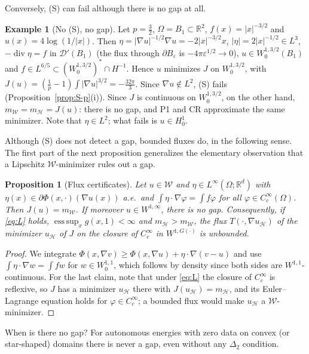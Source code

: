 \documentclass[11pt]{amsart}
\newtheorem{proposition}[theorem]{Proposition}
\theoremstyle{definition}
\newtheorem{example}[theorem]{Example}
\theoremstyle{remark}
\numberwithin{equation}{section}
\newcommand{\R}{\mathbb{R}}
\newcommand{\abs}[1]{\lvert #1\rvert}
\newcommand{\Wc}{\mathcal W}
\newcommand{\Hc}{\mathcal H}
\newcommand{\mW}{m_{\mathcal W}}
\newcommand{\mH}{m_{\mathcal H}}
\DeclareMathOperator{\divg}{div}
\DeclareMathOperator*{\esssup}{ess\,sup}
\begin{document}
Conversely, (S) can fail although there is no gap at all.

\begin{example}[No (S), no gap]\label{ex:noS}
Let $p=\frac32$, $\Omega=B_1\subset\R^2$, $f(x)=\abs x^{-3/2}$ and $u(x)=4\log(1/\abs x)$. Then $\eta=\abs{\nabla u}^{-1/2}\nabla u=-2\abs x^{-3/2}x$, $\abs\eta=2\abs x^{-1/2}\in L^{3}$, $-\divg\eta=f$ in $\mathcal D'(B_1)$ (the flux through $\partial B_\varepsilon$ is $-4\pi\varepsilon^{1/2}\to0$), $u\in W^{1,3/2}_0(B_1)$ and $f\in L^{6/5}\subset(W^{1,3/2}_0)^*\cap H^{-1}$. Hence $u$ minimizes $J$ on $W^{1,3/2}_0$, with $J(u)=(\frac1p-1)\int\abs{\nabla u}^{3/2}=-\frac{32\pi}3$. Since $\nabla u\notin L^2$, (S) fails (Proposition~\ref{prop:S-p}(i)). Since $J$ is continuous on $W^{1,3/2}_0$, on the other hand, $\mW=\mH=J(u)$: there is no gap, and P1 and CR approximate the same minimizer. Note that $\eta\in L^2$; what fails is $u\in H^1_0$.
\end{example}

Although (S) does not detect a gap, bounded fluxes do, in the following sense. The first part of the next proposition generalizes the elementary observation that a Lipschitz $\Wc$-minimizer rules out a gap.

\begin{proposition}[Flux certificates]\label{prop:cert}
Let $u\in\Wc$ and $\eta\in L^\infty(\Omega;\R^d)$ with $\eta(x)\in\partial\Phi(x,\cdot)(\nabla u(x))$ a.e.\ and $\int\eta\cdot\nabla\varphi=\int f\varphi$ for all $\varphi\in C^\infty_c(\Omega)$. Then $J(u)=\mW$. If moreover $u\in W^{1,\infty}$, there is no gap. Consequently, if \eqref{eq:L} holds, $\esssup_xg(x,1)<\infty$ and $\mH>\mW$, the flux $T(\cdot,\nabla u_{\Hc})$ of the minimizer $u_{\Hc}$ of $J$ on the closure of $C^\infty_c$ in $W^{1,G(\cdot)}$ is unbounded.
\end{proposition}
\begin{proof}
We integrate $\Phi(x,\nabla v)\ge\Phi(x,\nabla u)+\eta\cdot\nabla(v-u)$ and use $\int\eta\cdot\nabla w=\int fw$ for $w\in W^{1,1}_0$, which follows by density since both sides are $W^{1,1}$-continuous. For the last claim, note that under \eqref{eq:L} the closure of $C^\infty_c$ is reflexive, so $J$ has a minimizer $u_{\Hc}$ there with $J(u_{\Hc})=\mH$, and its Euler--Lagrange equation holds for $\varphi\in C^\infty_c$; a bounded flux would make $u_{\Hc}$ a $\Wc$-minimizer.
\end{proof}

When is there no gap? For autonomous energies with zero data on convex (or star-shaped) domains there is never a gap, even without any $\Delta_2$ condition.
\end{document}
